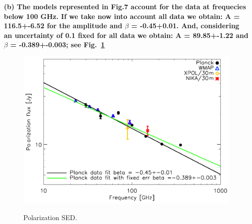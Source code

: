 \documentclass[report,twocolumn]{aa}
\begin{document}
\textbf{(b) The models represented in Fig.7 account for the data at frequecies below 100 GHz. If we take now into account all data we obtain:
A = 116.5+-6.52 for the amplitude and $\beta$ = -0.45+0.01.
And, considering an uncertainty of 0.1 fixed for all data we obtain:
A = 89.85+-1.22 and $\beta$ = -0.389+-0.003; see Fig.~\ref{crab_polar_SED}}
\begin{figure}[h!]
  \centering
     	  { \includegraphics[width=0.5\linewidth,keepaspectratio]{referee_figures/Crab_SED_ipol_test.pdf}}
     	  \caption{Polarization SED.}  
     	\label{crab_polar_SED}
\end{figure}
  
\end{document}
